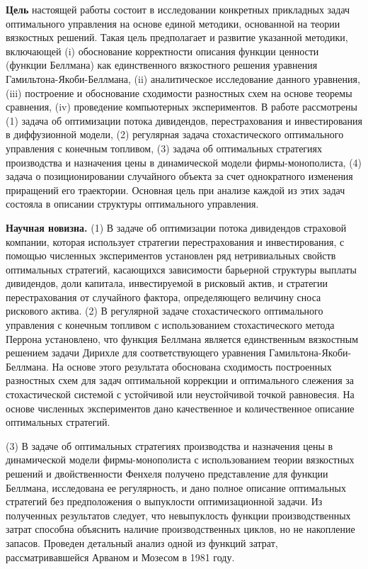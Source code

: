 \textbf{Цель} настоящей работы состоит в исследовании конкретных прикладных задач оптимального управления на основе единой методики, основанной на теории вязкостных решений. Такая цель предполагает и развитие указанной методики, включающей (i) обоснование корректности описания функции ценности (функции Беллмана) как единственного вязкостного решения уравнения Гамильтона-Якоби-Беллмана, (ii) аналитическое исследование данного уравнения, (iii) построение и обоснование сходимости разностных схем на основе теоремы сравнения, (iv) проведение компьютерных экспериментов. В работе рассмотрены (1) задача об оптимизации потока дивидендов, перестрахования и инвестирования в диффузионной модели, (2) регулярная задача стохастического оптимального управления с конечным топливом, (3) задача об оптимальных стратегиях производства и назначения цены в динамической модели фирмы-монополиста, (4) задача о позиционировании случайного объекта за счет однократного изменения приращений его траектории. Основная цель при анализе каждой из этих задач состояла в описании структуры оптимального управления.

\textbf{Научная новизна.} (1) В задаче об оптимизации потока дивидендов страховой компании, которая использует стратегии перестрахования и инвестирования, с помощью численных экспериментов установлен ряд нетривиальных свойств оптимальных стратегий, касающихся зависимости барьерной структуры выплаты дивидендов, доли капитала, инвестируемой в рисковый актив, и стратегии перестрахования от случайного фактора, определяющего величину сноса рискового актива.
(2) В регулярной задаче стохастического оптимального управления с конечным топливом с использованием стохастического метода Перрона установлено, что функция Беллмана является единственным вязкостным решением задачи Дирихле для соответствующего уравнения Гамильтона-Якоби-Беллмана. На основе этого результата обоснована сходимость построенных разностных схем для задач оптимальной коррекции и оптимального слежения за стохастической системой с устойчивой или неустойчивой точкой равновесия. На основе численных экспериментов дано качественное и количественное описание оптимальных стратегий. 

(3) В задаче об оптимальных стратегиях производства и назначения цены в динамической модели фирмы-монополиста с использованием теории вязкостных решений и двойственности Фенхеля получено представление для функции Беллмана, исследована ее регулярность, и дано полное описание оптимальных стратегий без предположения о выпуклости оптимизационной задачи. Из полученных результатов следует, что невыпуклость функции производственных затрат способна объяснить наличие производственных циклов, но не накопление запасов. Проведен детальный анализ одной из функций затрат, рассматривавшейся Арваном и Мозесом \cite{ArvMos81} в 1981 году.

